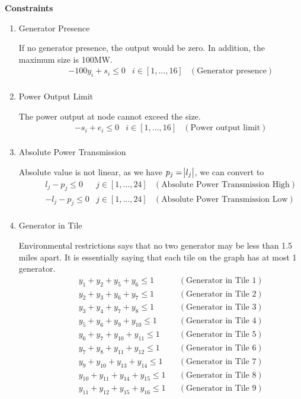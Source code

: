 \textbf{Constraints}
\begin{enumerate}
\item Generator Presence\par
If no generator presence, the output would be zero. In addition, the maximum size is 100MW. 
\begin{align*}
&&& - 100y_i + s_i \leq 0 & i \in [1,...,16] & (\text{Generator presence})\\
\end{align*}

\item Power Output Limit\par
The power output at node cannot exceed the size.
\begin{align*}
&&& - s_i + e_i \leq 0 & i \in [1,...,16] & (\text{Power output limit})\\
\end{align*}

\item Absolute Power Transmission\par
Absolute value is not linear, as we have $p_j = \abs{l_j}$, we can convert to
\begin{align*}
&&& l_j - p_j \leq 0 & j \in [1,...,24] & (\text{Absolute Power Transmission High}) \\
&&& -l_j - p_j \leq 0 & j \in [1,...,24] & (\text{Absolute Power Transmission Low}) \\
\end{align*}

\item Generator in Tile\par
Environmental restrictions says that no two generator may be less than 1.5 miles apart. It is essentially saying that each tile on the graph has at most 1 generator.
\begin{align*}
&&& y_1 + y_2 + y_5 + y_6 \leq 1 && (\text{Generator in Tile 1}) \\
&&& y_2 + y_3 + y_6 + y_7 \leq 1 && (\text{Generator in Tile 2}) \\
&&& y_3 + y_4 + y_7 + y_8 \leq 1 && (\text{Generator in Tile 3}) \\
&&& y_5 + y_6 + y_9 + y_{10} \leq 1 && (\text{Generator in Tile 4}) \\
&&& y_6 + y_7 + y_{10} + y_{11} \leq 1 && (\text{Generator in Tile 5}) \\
&&& y_7 + y_8 + y_{11} + y_{12} \leq 1 && (\text{Generator in Tile 6}) \\
&&& y_9 + y_{10} + y_{13} + y_{14} \leq 1 && (\text{Generator in Tile 7}) \\
&&& y_{10} + y_{11} + y_{14} + y_{15} \leq 1 && (\text{Generator in Tile 8}) \\
&&& y_{11} + y_{12} + y_{15} + y_{16} \leq 1 && (\text{Generator in Tile 9}) \\
\end{align*}


\end{enumerate}
